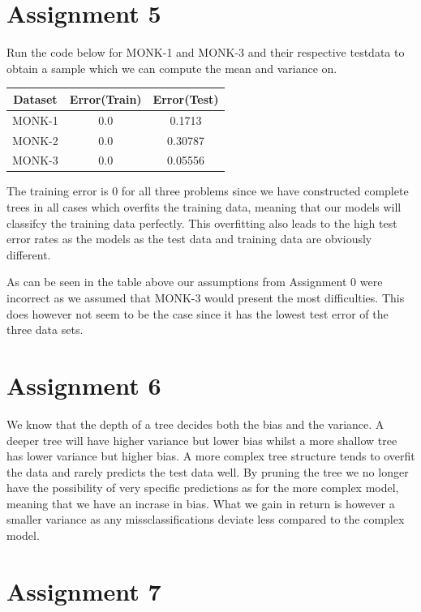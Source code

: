 \documentclass{article}
\begin{document}
\section*{Assignment 5}


Run the code below for MONK-1 and MONK-3 and their respective testdata to obtain a sample which we can 
compute the mean and variance on.

\begin{center}
 \begin{tabular}{|c | c | c |} 
 \hline
 Dataset & Error(Train) &  Error(Test) \\ [0.5ex] 
 \hline \hline
 MONK-1 & 0.0 & 0.1713 \\ 
 MONK-2 & 0.0 & 0.30787 \\ 
 MONK-3 & 0.0 & 0.05556  \\ [1ex] 
 \hline
\end{tabular}
\end{center}

The training error is $0$ for all three problems since we have constructed complete trees in all cases which overfits the training data, meaning that our models will classifcy the training data perfectly. This overfitting also leads to the high test error rates as the models as the test data and training data are obviously different. 

As can be seen in the table above our assumptions from Assignment 0 were incorrect as we assumed that MONK-3 would present the most difficulties. This does however not seem to be the case since it has the lowest test error of the three data sets. 


\section*{Assignment 6}

We know that the depth of a tree decides both the bias and the variance. A deeper tree will have higher variance but lower bias whilst a more shallow tree has lower variance but higher bias. A more complex tree structure tends to overfit the data and rarely predicts the test data well. By pruning the tree we no longer have the possibility of very specific predictions as for the more complex model, meaning that we have an incrase in bias. What we gain in return is however a smaller variance as any missclassifications deviate less compared to the complex model.

\section*{Assignment 7}
\end{document}
